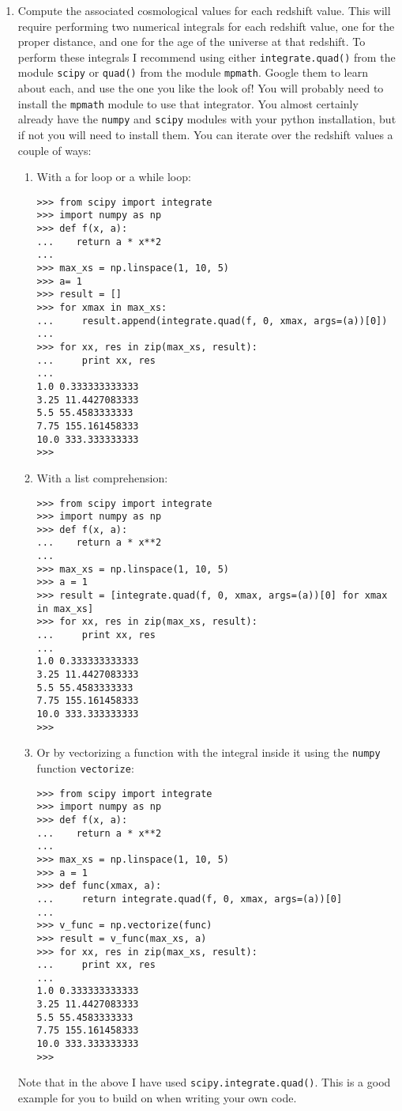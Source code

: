 \documentclass[]{article}
\begin{document}
\begin{enumerate}
\item Compute the associated cosmological values for each redshift value. This will require performing two numerical integrals for each redshift value, one for the proper distance, and one for the age of the universe at that redshift. To perform these integrals I recommend using either \texttt{integrate.quad()} from the module \texttt{scipy} or \texttt{quad()} from the module \texttt{mpmath}. Google them to learn about each, and use the one you like the look of! You will probably need to install the \texttt{mpmath} module to use that integrator. You almost certainly already have the \texttt{numpy} and \texttt{scipy} modules with your python installation, but if not you will need to install them. You can iterate over the redshift values a couple of ways:
\begin{enumerate}
\item With a for loop or a while loop:
\begin{lstlisting}
>>> from scipy import integrate
>>> import numpy as np
>>> def f(x, a):
...    return a * x**2
... 
>>> max_xs = np.linspace(1, 10, 5)
>>> a= 1
>>> result = []
>>> for xmax in max_xs:
...     result.append(integrate.quad(f, 0, xmax, args=(a))[0])
...
>>> for xx, res in zip(max_xs, result):
...     print xx, res
... 
1.0 0.333333333333
3.25 11.4427083333
5.5 55.4583333333
7.75 155.161458333
10.0 333.333333333
>>> 
\end{lstlisting}

\item With a list comprehension:
\begin{lstlisting}
>>> from scipy import integrate
>>> import numpy as np
>>> def f(x, a):
...    return a * x**2
... 
>>> max_xs = np.linspace(1, 10, 5)
>>> a = 1
>>> result = [integrate.quad(f, 0, xmax, args=(a))[0] for xmax in max_xs]
>>> for xx, res in zip(max_xs, result):
...     print xx, res
... 
1.0 0.333333333333
3.25 11.4427083333
5.5 55.4583333333
7.75 155.161458333
10.0 333.333333333
>>> 
\end{lstlisting}

\item Or by vectorizing a function with the integral inside it using the \texttt{numpy} function \texttt{vectorize}:
\begin{lstlisting}
>>> from scipy import integrate
>>> import numpy as np
>>> def f(x, a):
...    return a * x**2
... 
>>> max_xs = np.linspace(1, 10, 5)
>>> a = 1
>>> def func(xmax, a):
...     return integrate.quad(f, 0, xmax, args=(a))[0]
... 
>>> v_func = np.vectorize(func)
>>> result = v_func(max_xs, a)
>>> for xx, res in zip(max_xs, result):
...     print xx, res
... 
1.0 0.333333333333
3.25 11.4427083333
5.5 55.4583333333
7.75 155.161458333
10.0 333.333333333
>>> 
\end{lstlisting}
\end{enumerate} 
Note that in the above I have used \texttt{scipy.integrate.quad()}. This is a good example for you to build on when writing your own code. 


\end{enumerate}
\end{document}
